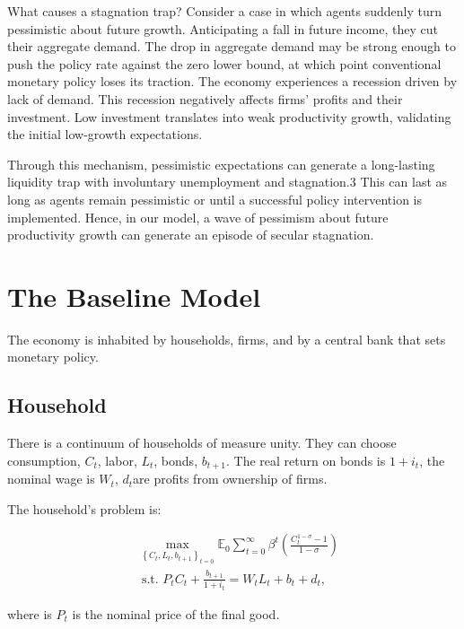 \documentclass[10pt,math=newtx,citestyle=gb7714-2015,bibstyle=gb7714-2015]{elegantbook}
\begin{document}
{{{\begin{itemize}
		What causes a stagnation trap? Consider a case in which agents suddenly turn pessimistic about future growth. Anticipating a fall in future income, they cut their aggregate demand. The drop in aggregate demand may be strong enough to push the policy rate against the zero lower bound, at which point conventional monetary policy loses its traction. The economy experiences a recession driven by lack of demand. This recession negatively affects firms' profits and their investment. Low investment translates into weak productivity growth, validating the initial low-growth expectations.
		
		Through this mechanism, pessimistic expectations can generate a long-lasting liquidity trap with involuntary unemployment and stagnation.3 This can last as long as agents remain pessimistic or until a successful policy intervention is implemented. Hence, in our model, a wave of pessimism about future productivity growth can generate an episode of secular stagnation.
		
	\end{itemize}	

	
	
	
	\section{The Baseline Model}
	
	The economy is inhabited by households, firms, and by a central bank that sets monetary policy.

	\subsection{Household}
	
	There is a continuum of households of measure unity. They can choose consumption, $C_t$, labor, $L_t$, bonds, $b_{t+1}$. The real return on bonds is $1+i_t$, the nominal wage is $W_t$, $d_t$are profits from ownership of firms.
	
	The household's problem is:
	
	$$
	\begin{aligned}
		&\max _{\left\{C_{t}, L_{t}, b_{t+1}\right\}_{t=0}} \mathbb{E}_{0} \sum_{t=0}^{\infty} \beta^{t}\left(\frac{C_{t}^{1-\sigma}-1}{1-\sigma}\right) \\
		&\text { s.t. } P_tC_{t}+\frac{b_{t+1}}{1+i_t}=W_{t} L_{t}+b_t+d_{t},
	\end{aligned}
	$$
	
	where is $P_t$ is the nominal price of the final good.
	
}}}
\end{document}
